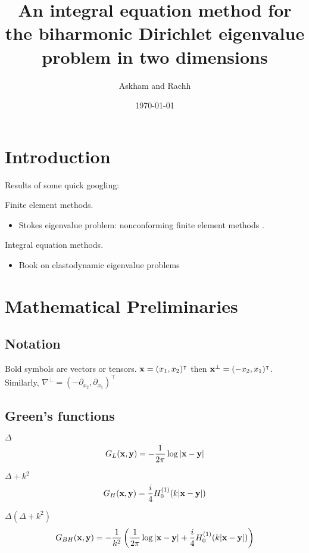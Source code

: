 \documentclass[preprint,12pt]{article}
\title{An integral equation method for the biharmonic
Dirichlet eigenvalue problem in two dimensions}
\author{Askham and Rachh}
\date{\today}
\def\xx{{\bf x}}
\def\yy{{\bf y}}
\begin{document}
\maketitle


\section{Introduction}

Results of some quick googling:

Finite element methods.
\begin{itemize}
\item Stokes eigenvalue problem: nonconforming finite
  element methods \cite{jia2009approximation}.
\end{itemize}

Integral equation methods.
\begin{itemize}
\item Book on elastodynamic eigenvalue problems
  \cite{kitahara2014boundary}
\end{itemize}
\section{Mathematical Preliminaries}

\subsection{Notation}

Bold symbols are vectors or tensors.
$\xx = (x_1,x_2)^\intercal$ then $\xx^\bot = (-x_2,x_1)^\intercal$.
Similarly, $\nabla^\bot = (-\partial_{x_2},\partial_{x_1})^\intercal$

\subsection{Green's functions}

$\Delta$
\begin{equation}
  G_L(\xx,\yy) = -\frac{1}{2\pi} \log |\xx-\yy|
\end{equation}

$\Delta + k^2$
\begin{equation}
  G_H(\xx,\yy) = \frac{i}{4} H_0^{(1)}(k|\xx-\yy|)
\end{equation}

$\Delta(\Delta + k^2)$
\begin{equation}
  G_{BH}(\xx,\yy) = -\frac{1}{k^2}
  \left (\frac{1}{2\pi} \log |\xx-\yy| +
  \frac{i}{4} H_0^{(1)}(k|\xx-\yy|) \right )
\end{equation}
\end{document}
